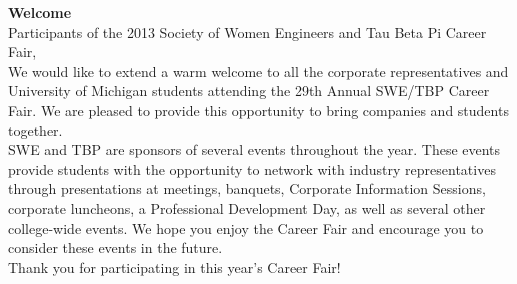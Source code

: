 \documentclass[twoside]{article}
\begin{document}

\startforewardsection
{ \fontsize{16}{19}\selectfont \bf Welcome}\\Participants of the 2013 Society of Women Engineers and Tau Beta Pi Career Fair, 
\\

We would like to extend a warm welcome to all the corporate representatives and University of Michigan students attending the 29th Annual SWE/TBP Career Fair. We are pleased to provide this opportunity to bring companies and students together. 
\\

SWE and TBP are sponsors of several events throughout the year. These events provide students with the opportunity to network with industry representatives through presentations at meetings, banquets, Corporate Information Sessions, corporate luncheons, a Professional Development Day, as well as several other college-wide events. We hope you enjoy the Career Fair and encourage you to consider these events in the future.  
\\

Thank you for participating in this year's Career Fair!
\\
\end{document}
